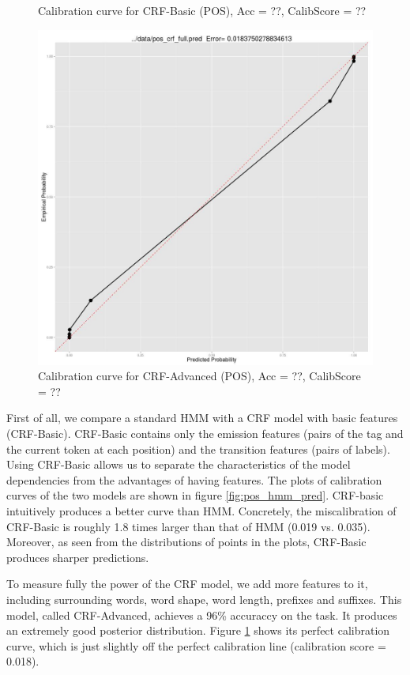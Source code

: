 \begin{figure}[t]
  \caption{Calibration curve for CRF-Basic (POS), Acc = ??, CalibScore = ??}
  \label{fig:pos_crf_pred}
\endminipage\hfill
{}
  \includegraphics[width=\linewidth, valign=t]{pos_crf_advanced_pred.jpg}
  \caption{Calibration curve for CRF-Advanced (POS), Acc = ??, CalibScore = ??}
  \label{fig:pos_crf_advanced_pred}  
\endminipage
\end{figure}

First of all, we compare a standard HMM with a CRF model with basic features (CRF-Basic). CRF-Basic contains only the emission features (pairs of the tag and the current token at each position) and the transition features (pairs of labels). Using CRF-Basic allows us to separate the characteristics of the model dependencies from the advantages of having features. The plots of calibration curves of the two models are shown in figure \ref{fig:pos_hmm_pred}. CRF-basic intuitively produces a better curve than HMM. Concretely, the miscalibration of CRF-Basic is roughly 1.8 times larger than that of HMM (0.019 vs. 0.035). Moreover, as seen from the distributions of points in the plots, CRF-Basic produces sharper predictions.

To measure fully the power of the CRF model, we add more features to it, including surrounding words, word shape, word length, prefixes and suffixes. This model, called CRF-Advanced, achieves a 96\% accuraccy on the task. It produces an extremely good posterior distribution. Figure \ref{fig:pos_crf_advanced_pred} shows its perfect calibration curve, which is just slightly off the perfect calibration line (calibration score = 0.018). 


